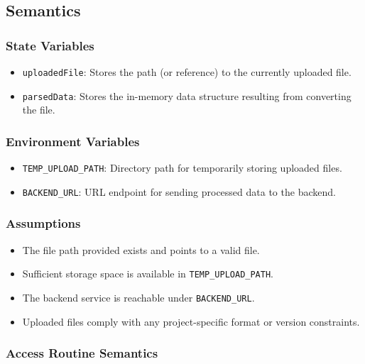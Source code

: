 \documentclass[12pt, titlepage]{article}
\begin{document}
\subsection{Semantics}

\subsubsection{State Variables}


\begin{itemize}
    \item \texttt{uploadedFile}: Stores the path (or reference) to the currently uploaded file.
    \item \texttt{parsedData}: Stores the in-memory data structure resulting from converting the file.
\end{itemize}

\subsubsection{Environment Variables}

\begin{itemize}
    \item \texttt{TEMP\_UPLOAD\_PATH}: Directory path for temporarily storing uploaded files.
    \item \texttt{BACKEND\_URL}: URL endpoint for sending processed data to the backend.
\end{itemize}

\subsubsection{Assumptions}

\begin{itemize}
    \item The file path provided exists and points to a valid file.
    \item Sufficient storage space is available in \texttt{TEMP\_UPLOAD\_PATH}.
    \item The backend service is reachable under \texttt{BACKEND\_URL}.
    \item Uploaded files comply with any project-specific format or version constraints.
\end{itemize}

\subsubsection{Access Routine Semantics}
\end{document}
